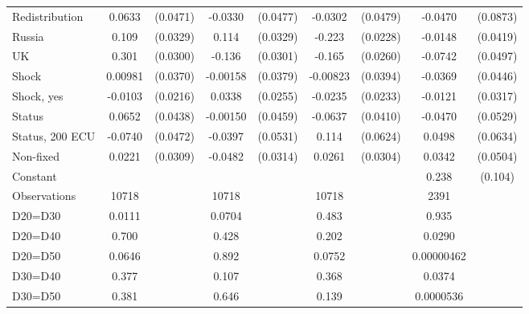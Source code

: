 \begin{tabular}{l|cccccc|cc}
Redistribution&   0.0633         & (0.0471)&  -0.0330         & (0.0477)&  -0.0302         & (0.0479)&  -0.0470         & (0.0873)\\
Russia        &    0.109\sym{***}& (0.0329)&    0.114\sym{***}& (0.0329)&   -0.223\sym{***}& (0.0228)&  -0.0148         & (0.0419)\\
UK            &    0.301\sym{***}& (0.0300)&   -0.136\sym{***}& (0.0301)&   -0.165\sym{***}& (0.0260)&  -0.0742         & (0.0497)\\
Shock         &  0.00981         & (0.0370)& -0.00158         & (0.0379)& -0.00823         & (0.0394)&  -0.0369         & (0.0446)\\
Shock, yes    &  -0.0103         & (0.0216)&   0.0338         & (0.0255)&  -0.0235         & (0.0233)&  -0.0121         & (0.0317)\\
Status        &   0.0652         & (0.0438)& -0.00150         & (0.0459)&  -0.0637         & (0.0410)&  -0.0470         & (0.0529)\\
Status, 200 ECU&  -0.0740         & (0.0472)&  -0.0397         & (0.0531)&    0.114\sym{*}  & (0.0624)&   0.0498         & (0.0634)\\
Non-fixed     &   0.0221         & (0.0309)&  -0.0482         & (0.0314)&   0.0261         & (0.0304)&   0.0342         & (0.0504)\\
Constant        &                  &         &                  &         &                  &         &    0.238\sym{**} &  (0.104)\\
\hline
Observations    &    10718         &         &    10718         &         &    10718         &         &     2391         &         \\
D20=D30         &   0.0111         &         &   0.0704         &         &    0.483         &         &    0.935         &         \\
D20=D40         &    0.700         &         &    0.428         &         &    0.202         &         &   0.0290         &         \\
D20=D50         &   0.0646         &         &    0.892         &         &   0.0752         &         &0.00000462         &         \\
D30=D40         &    0.377         &         &    0.107         &         &    0.368         &         &   0.0374         &         \\
D30=D50         &    0.381         &         &    0.646         &         &    0.139         &         &0.0000536         &         \\

\end{tabular}
